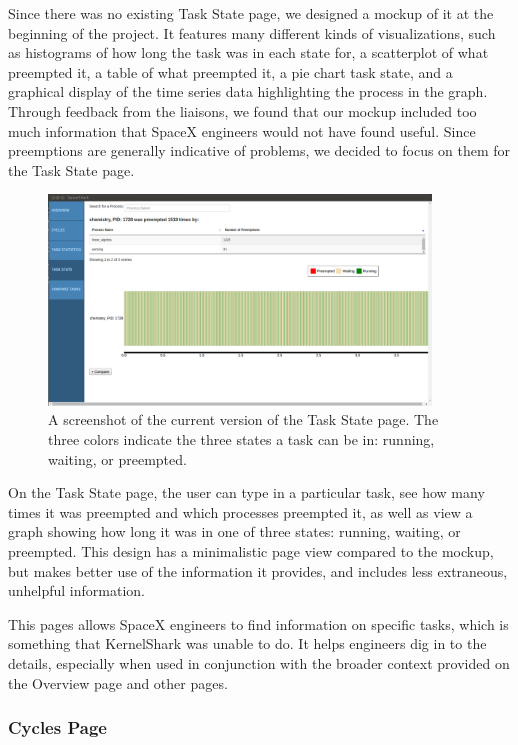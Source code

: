 \documentclass{hmcclinic}
\begin{document}
Since there was no existing Task State page, we designed a mockup of it at the
beginning of the project. It features many different kinds of visualizations,
such as histograms of how long the task was in each state for, a scatterplot of
what preempted it, a table of what preempted it, a pie chart task state, and a
graphical display of the time series data highlighting the process in the graph.
Through feedback from the liaisons, we found that our mockup included
too much information that SpaceX engineers would not have found useful. Since
preemptions are generally indicative of problems, we decided to focus on
them for the Task State page.

\begin{figure}[H]
\begin{center}
\includegraphics[width=4in]{task-state-page.png}
\caption{A screenshot of the current version of the Task State page. The three
colors indicate the three states a task can be in: running, waiting, or
preempted.}
\end{center}
\end{figure}

On the Task State page, the user can type in a particular task, see
how many times it was preempted and which processes preempted it, as well as
view a graph showing how long it was in one of three states: running, waiting,
or preempted. This design has a minimalistic page view compared to the mockup,
but makes better use of the information it provides, and includes less
extraneous, unhelpful information.

This pages allows SpaceX engineers to find information on specific tasks, which
is something that KernelShark was unable to do. It helps engineers dig in to the
details, especially when used in conjunction with the broader context provided
on the Overview page and other pages.

\subsubsection{Cycles Page}
\end{document}
